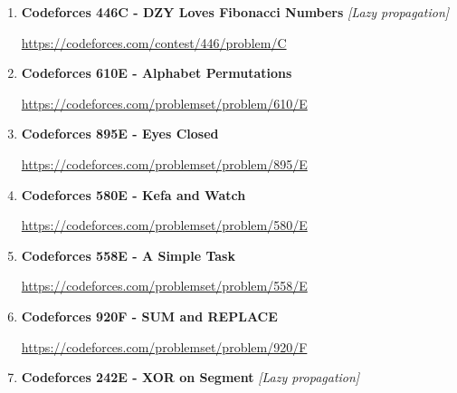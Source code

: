 \documentclass[11pt]{article}
\begin{document}
\begin{enumerate}
    \vspace{0.8em}

    \item \textbf{Codeforces 446C - DZY Loves Fibonacci Numbers}
    \hfill \textit{[Lazy propagation]}

    \vspace{0.3em}
    {\small\url{https://codeforces.com/contest/446/problem/C}}

    \vspace{0.8em}

    \item \textbf{Codeforces 610E - Alphabet Permutations}

    \vspace{0.3em}
    {\small\url{https://codeforces.com/problemset/problem/610/E}}

    \vspace{0.8em}

    \item \textbf{Codeforces 895E - Eyes Closed}

    \vspace{0.3em}
    {\small\url{https://codeforces.com/problemset/problem/895/E}}

    \vspace{0.8em}

    \item \textbf{Codeforces 580E - Kefa and Watch}

    \vspace{0.3em}
    {\small\url{https://codeforces.com/problemset/problem/580/E}}

    \vspace{0.8em}

    \item \textbf{Codeforces 558E - A Simple Task}

    \vspace{0.3em}
    {\small\url{https://codeforces.com/problemset/problem/558/E}}

    \vspace{0.8em}

    \item \textbf{Codeforces 920F - SUM and REPLACE}

    \vspace{0.3em}
    {\small\url{https://codeforces.com/problemset/problem/920/F}}

    \vspace{0.8em}

    \item \textbf{Codeforces 242E - XOR on Segment}
    \hfill \textit{[Lazy propagation]}


\end{enumerate}
\end{document}
